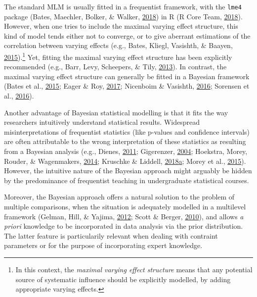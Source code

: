 \documentclass[a4paper,12pt,twoside,onecolumn,openright,final,oldfontcommands]{memoir}
\let\rmarkdownfootnote\footnote%
\def\footnote{\protect\rmarkdownfootnote}
\begin{document}
The standard MLM is usually fitted in a frequentist framework, with the \texttt{lme4} package (Bates, Maechler, Bolker, \& Walker, \protect\hyperlink{ref-R-lme4}{2018}) in R (R Core Team, \protect\hyperlink{ref-R-base}{2018}). However, when one tries to include the maximal varying effect structure, this kind of model tends either not to converge, or to give aberrant estimations of the correlation between varying effects (e.g., Bates, Kliegl, Vasishth, \& Baayen, \protect\hyperlink{ref-bates_parsimonious_2015}{2015}).\footnote{In this context, the \emph{maximal varying effect structure} means that any potential source of systematic influence should be explicitly modelled, by adding appropriate varying effects.} Yet, fitting the maximal varying effect structure has been explicitly recommended (e.g., Barr, Levy, Scheepers, \& Tily, \protect\hyperlink{ref-barr_random_2013-1}{2013}). In contrast, the maximal varying effect structure can generally be fitted in a Bayesian framework (Bates et al., \protect\hyperlink{ref-bates_parsimonious_2015}{2015}; Eager \& Roy, \protect\hyperlink{ref-eager_mixed_2017}{2017}; Nicenboim \& Vasishth, \protect\hyperlink{ref-nicenboim_statistical_2016}{2016}; Sorensen et al., \protect\hyperlink{ref-sorensen_bayesian_2016}{2016}).

Another advantage of Bayesian statistical modelling is that it fits the way researchers intuitively understand statistical results. Widespread misinterpretations of frequentist statistics (like p-values and confidence intervals) are often attributable to the wrong interpretation of these statistics as resulting from a Bayesian analysis (e.g., Dienes, \protect\hyperlink{ref-dienes_bayesian_2011}{2011}; Gigerenzer, \protect\hyperlink{ref-Gigerenzer2004}{2004}; Hoekstra, Morey, Rouder, \& Wagenmakers, \protect\hyperlink{ref-Hoekstra2014}{2014}; Kruschke \& Liddell, \protect\hyperlink{ref-kruschke_bayesian_2018}{2018}\protect\hyperlink{ref-kruschke_bayesian_2018}{a}; Morey et al., \protect\hyperlink{ref-morey_fallacy_2015}{2015}). However, the intuitive nature of the Bayesian approach might arguably be hidden by the predominance of frequentist teaching in undergraduate statistical courses.

Moreover, the Bayesian approach offers a natural solution to the problem of multiple comparisons, when the situation is adequately modelled in a multilevel framework (Gelman, Hill, \& Yajima, \protect\hyperlink{ref-gelman_why_2012}{2012}; Scott \& Berger, \protect\hyperlink{ref-scott_bayes_2010}{2010}), and allows \emph{a priori} knowledge to be incorporated in data analysis via the prior distribution. The latter feature is particularily relevant when dealing with contraint parameters or for the purpose of incorporating expert knowledge.
\end{document}
